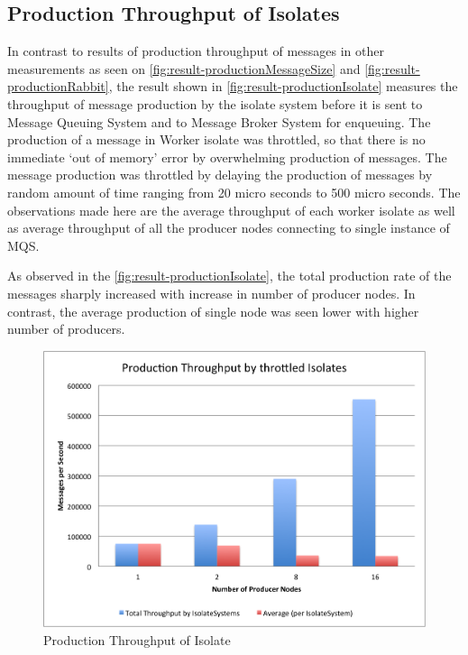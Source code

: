 \subsection{Production Throughput of Isolates}
In contrast to results of production throughput of messages in other measurements as seen on \autoref{fig:result-productionMessageSize} and \autoref{fig:result-productionRabbit}, the result shown in
 \autoref{fig:result-productionIsolate} measures the throughput of message production by the isolate system before it is sent to Message Queuing System and to Message Broker System for enqueuing. The production of a message in Worker isolate was throttled, so that there is no immediate ‘out of memory’ error by overwhelming production of messages. The message production was throttled by delaying the production of messages by random amount of time ranging from 20 micro seconds to 500 micro seconds. The observations made here are the average throughput of each worker isolate as well as average throughput of all the producer nodes connecting to single instance of MQS.

  As observed in the \autoref{fig:result-productionIsolate}, the total production rate of the messages sharply increased with increase in number of producer nodes. In contrast, the average production of single node was seen lower with higher number of producers.

\begin{figure}[H]
  \centering
  \includegraphics[width=1\textwidth]{figures/06productionIsolate}
  \caption[Production Throughput of Isolate]{Production Throughput of Isolate}
  \label{fig:result-productionIsolate}
\end{figure}


